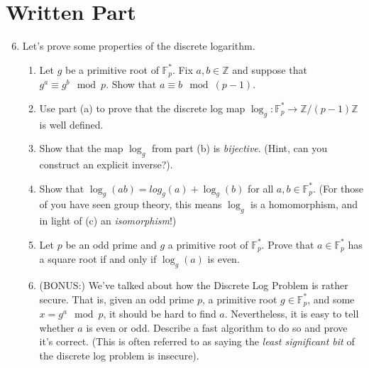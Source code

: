 \documentclass[11pt]{article}
\newcommand{\bF}{\mathbb{F}}
\newcommand{\bZ}{\mathbb{Z}}
\begin{document}
\section*{Written Part}
\begin{enumerate}
  \setcounter{enumi}{5}
  \item{
  Let's prove some properties of the discrete logarithm.
  \begin{enumerate}
    \item{
    Let $g$ be a primitive root of $\bF_p^*$.  Fix $a,b\in\bZ$ and suppose that $g^a\equiv g^b\mod p$.  Show that $a\equiv b\mod(p-1)$.
    }
    \item{
    Use part (a) to prove that the discrete log map $\log_g:\bF_p^*\longrightarrow\bZ/(p-1)\bZ$ is well defined.
    }
    \item{
    Show that the map $\log_g$ from part (b) is \textit{bijective}.  (Hint, can you construct an explicit inverse?).
    }
    \item{
    Show that $\log_g(ab) = log_g(a)+\log_g(b)$ for all $a,b\in\bF_p^*$.  (For those of you have seen group theory, this means $\log_g$ is a homomorphism, and in light of (c) an \textit{isomorphism}!)
    }
    \item{
    Let $p$ be an odd prime and $g$ a primitive root of $\bF_p^*$.  Prove that $a\in\bF_p^*$ has a square root if and only if $\log_g(a)$ is even.
    }
    \item{
    (BONUS:) We've talked about how the Discrete Log Problem is rather secure.  That is, given an odd prime $p$, a primitive root $g\in\bF_p^*$, and some $x = g^a\mod p$, it should be hard to find $a$.  Nevertheless, it is easy to tell whether $a$ is even or odd.  Describe a fast algorithm to do so and prove it's correct.  (This is often referred to as saying the \textit{least significant bit} of the discrete log problem is insecure).
    }
  \end{enumerate}
}
\end{enumerate}
\end{document}
